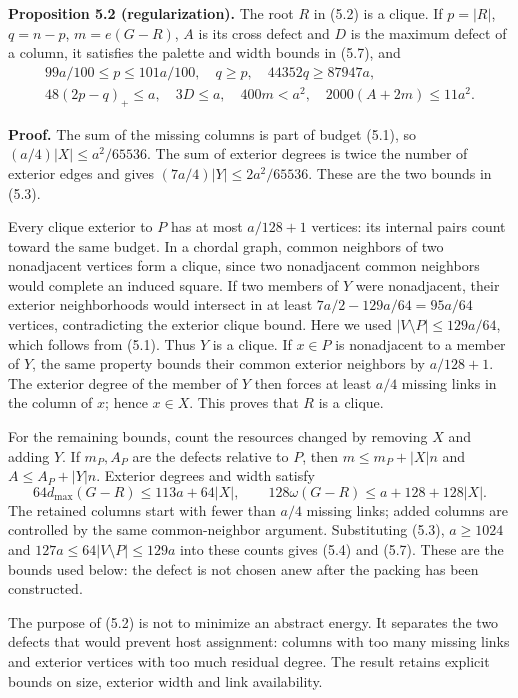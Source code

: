 \documentclass[english,11pt,a4paper]{article}
\begin{document}
\textbf{Proposition 5.2 (regularization).} The root \(R\) in (5.2) is a clique. If \(p=|R|\), \(q=n-p\), \(m=e(G-R)\), \(A\) is its cross defect and \(D\) is the maximum defect of a column, it satisfies the palette and width bounds in (5.7), and \[
\begin{gathered}
99a/100\le p\le101a/100,\quad q\ge p,\quad
44352q\ge87947a,\\
48(2p-q)_+\le a,\quad 3D\le a,\quad
400m<a^2,\quad2000(A+2m)\le11a^2.
\end{gathered}
\tag{5.4}
\]

\textbf{Proof.} The sum of the missing columns is part of budget (5.1), so \((a/4)|X|\le a^2/65536\). The sum of exterior degrees is twice the number of exterior edges and gives \((7a/4)|Y|\le2a^2/65536\). These are the two bounds in (5.3).

Every clique exterior to \(P\) has at most \(a/128+1\) vertices: its internal pairs count toward the same budget. In a chordal graph, common neighbors of two nonadjacent vertices form a clique, since two nonadjacent common neighbors would complete an induced square. If two members of \(Y\) were nonadjacent, their exterior neighborhoods would intersect in at least \(7a/2-129a/64=95a/64\) vertices, contradicting the exterior clique bound. Here we used \(|V\setminus P|\le129a/64\), which follows from (5.1). Thus \(Y\) is a clique. If \(x\in P\) is nonadjacent to a member of \(Y\), the same property bounds their common exterior neighbors by \(a/128+1\). The exterior degree of the member of \(Y\) then forces at least \(a/4\) missing links in the column of \(x\); hence \(x\in X\). This proves that \(R\) is a clique.

For the remaining bounds, count the resources changed by removing \(X\) and adding \(Y\). If \(m_P,A_P\) are the defects relative to \(P\), then \(m\le m_P+|X|n\) and \(A\le A_P+|Y|n\). Exterior degrees and width satisfy \[
64d_{\max}(G-R)\le113a+64|X|,\qquad
128\omega(G-R)\le a+128+128|X|.
\] The retained columns start with fewer than \(a/4\) missing links; added columns are controlled by the same common-neighbor argument. Substituting (5.3), \(a\ge1024\) and \(127a\le64|V\setminus P|\le129a\) into these counts gives (5.4) and (5.7). These are the bounds used below: the defect is not chosen anew after the packing has been constructed.

The purpose of (5.2) is not to minimize an abstract energy. It separates the two defects that would prevent host assignment: columns with too many missing links and exterior vertices with too much residual degree. The result retains explicit bounds on size, exterior width and link availability.
\end{document}
